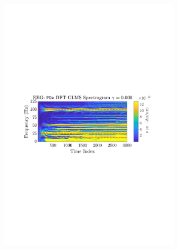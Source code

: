 \documentclass[12pt]{article}
\begin{document}
			\begin{figure}[H]
				\centering
				\begin{subfigure}{0.49\textwidth}
					\centering
					\includegraphics[trim={2.2cm 11.2cm 2.90cm  11.2cm}, clip, width=\textwidth]{../MATLAB/figures/q3_3d_fig01.pdf} 
					\captionsetup{justification=centering}
				\end{subfigure}
				\begin{subfigure}{0.49\textwidth}
					\centering

\end{subfigure}
\end{figure}
\end{document}
